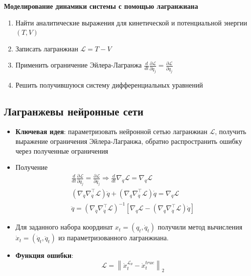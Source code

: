 \documentclass[12pt]{article}
\begin{document}
	\textbf{Моделирование динамики системы с помощью лагранжиана}
		\begin{enumerate}
			\item Найти аналитические выражения для кинетической и потенциальной энергии $(T, V )$
			\item Записать лагранжиан $\mathcal{L} = T - V $
			\item Применить ограничение Эйлера-Лагранжа $\frac{d}{d t} \frac{\partial \mathcal{L}}{\partial \dot{q}_{j}} =\frac{\partial \mathcal{L}}{\partial q_{j}} $
			\item Решить получившуюся систему дифференциальных уравнений
		\end{enumerate}

	
	\subsection{Лагранжевы нейронные сети}
	\begin{itemize}
		\item \textbf{Ключевая идея}: параметризовать нейронной сетью лагранжиан $\mathcal{L}$, получить выражение ограничения Эйлера-Лагранжа, обратно распространить ошибку через полученные ограничения
		\item Получение 	$$
		\begin{aligned}
		\frac{d}{d t} \frac{\partial \mathcal{L}}{\partial \dot{q}_{j}} =\frac{\partial \mathcal{L}}{\partial q_{j}}  \Rightarrow \frac{d}{d t} \nabla_{\dot{q}} \mathcal{L} =\nabla_{q} \mathcal{L} \\
		\left(\nabla_{\dot{q}} \nabla_{\dot{q}}^{\top} \mathcal{L}\right) \ddot{q}+\left(\nabla_{q} \nabla_{\dot{q}}^{\top} \mathcal{L}\right) \dot{q} =\nabla_{q} \mathcal{L} \\
		\ddot{q} =\left(\nabla_{\dot{q}} \nabla_{\dot{q}}^{\top} \mathcal{L}\right)^{-1}\left[\nabla_{q} \mathcal{L}-\left(\nabla_{q} \nabla_{\dot{q}}^{\top} \mathcal{L}\right) \dot{q}\right]
		\end{aligned}
		$$
		\item Для заданного набора координат $x_t = (q_t, \dot{q}_t)$ получили метод вычисления $\dot{x}_t = (\dot{q}_t, \ddot{q}_t)$ из параметризованного лагранжиана.
		\item \textbf{Функция ошибки}: $$\mathcal{L} = \left\|\dot{x}^{\mathcal{L_{\theta}}}_t -\dot{x}^{true}_t\right\|_{2}$$
	\end{itemize}
\end{document}
